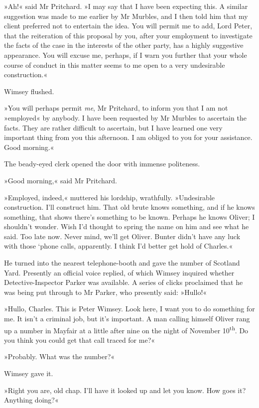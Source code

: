 »Ah!« said Mr Pritchard. »I may say that I have been expecting this. A similar suggestion was made to me earlier by Mr Murbles, and I then told him that my client preferred not to entertain the idea. You will permit me to add, Lord Peter, that the reiteration of this proposal by you, after your employment to investigate the facts of the case in the interests of the other party, has a highly suggestive appearance. You will excuse me, perhaps, if I warn you further that your whole course of conduct in this matter seems to me open to a very undesirable construction.«

Wimsey flushed.

»You will perhaps permit \textit{me}, Mr Pritchard, to inform you that I am not »employed« by anybody. I have been requested by Mr Murbles to ascertain the facts. They are rather difficult to ascertain, but I have learned one very important thing from you this afternoon. I am obliged to you for your assistance. Good morning.«

The beady-eyed clerk opened the door with immense politeness.

»Good morning,« said Mr Pritchard.

»Employed, indeed,« muttered his lordship, wrathfully. »Undesirable construction. I'll construct him. That old brute knows something, and if he knows something, that shows there's something to be known. Perhaps he knows Oliver; I shouldn't wonder. Wish I'd thought to spring the name on him and see what he said. Too late now. Never mind, we'll get Oliver. Bunter didn't have any luck with those `phone calls, apparently. I think I'd better get hold of Charles.«

He turned into the nearest telephone-booth and gave the number of Scotland Yard. Presently an official voice replied, of which Wimsey inquired whether Detective-Inspector Parker was available. A series of clicks proclaimed that he was being put through to Mr Parker, who presently said: »Hullo!«

»Hullo, Charles. This is Peter Wimsey. Look here, I want you to do something for me. It isn't a criminal job, but it's important. A man calling himself Oliver rang up a number in Mayfair at a little after nine on the night of November  10\textsuperscript{th}. Do you think you could get that call traced for me?«

»Probably. What was the number?«

Wimsey gave it.

»Right you are, old chap. I'll have it looked up and let you know. How goes it? Anything doing?«

